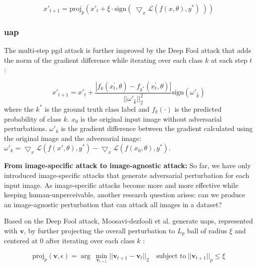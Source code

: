 \begin{equation}
x'_{t+1} = \text{proj}_{p}(x'_t + \xi \cdot \text{sign}(\ \bigtriangledown_x \mathcal{L}(f(x, \theta), y^*)\ ))
\end{equation}


\subsubsection{\acrfull{uap}}

The multi-step \acrshort{pgd} attack is further improved by the Deep Fool attack \citep{moosavidezfooli2016deepfool} that adds the norm of the gradient difference while iterating over each class $k$ at each step $t$:

\begin{equation}
x'_{t+1} = x'_t + \frac{|f_k(x^{'}_{t}, \theta) - f_{k^{*}}(x^{'}_{t}, \theta)|}{||\omega'_{\hat{k}}||^2_2} \text{sign}(\omega'_{\hat{k}})
\end{equation}
where the $k^*$ is the ground truth class label and $f_k(\cdot)$ is the predicted probability of class $k$. $x_0$ is the original input image without adversarial perturbations. $\omega'_k$ is the gradient difference between the gradient calculated using the original image and the adversarial image:  $\omega'_k = \bigtriangledown_x \mathcal{L}(f(x', \theta), y^*) - \bigtriangledown_x \mathcal{L}(f(x_0, \theta), y^*)$.

\textbf{From image-specific attack to image-agnostic attack:} So far, we have only introduced image-specific attacks that generate adversarial perturbation for each input image. As image-specific attacks become more and more effective while keeping human-unperceivable, another research question arises: can we produce an image-agnostic perturbation that can attack all images in a dataset?

Based on the Deep Fool attack, Moosavi-dezfooli et al. generate \acrshort{uap}s, represented with $\textbf{v}$, by further projecting the overall perturbation to $L_p$ ball of radius $\xi$ and centered at 0 after iterating over each class $k$ \citep{moosavidezfooli2017universal}:

\begin{equation}
\text{proj}_p(\textbf{v}, \epsilon)= \arg\ \underset{\textbf{v}_{t+1}}{\min}||\textbf{v}_{t+1} - \textbf{v}_{t}||_2 \quad \text{subject to}\ ||\textbf{v}_{t+1}||_p\leq\xi
\end{equation}

